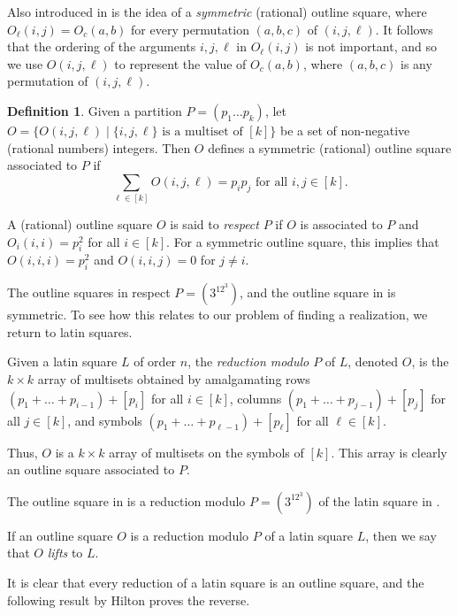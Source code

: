 \documentclass[preprint,nonatbib]{elsarticle}
\theoremstyle{definition}
\newtheorem{definition}[theorem]{Definition}
\numberwithin{equation}{section}
\begin{document}
Also introduced in \cite{kemp2024latin} is the idea of a \emph{symmetric} (rational) outline square, where $O_\ell(i,j) = O_c(a,b)$ for every permutation $(a,b,c)$ of $(i,j,\ell)$. It follows that the ordering of the arguments $i,j,\ell$ in $O_\ell(i,j)$ is not important, and so we use $O(i,j,\ell)$ to represent the value of $O_c(a,b)$, where $(a,b,c)$ is any permutation of $(i,j,\ell)$.

\begin{definition}
    Given a partition $P=(p_1\dots p_k)$, let $O = \{O(i,j,\ell)\mid \{i,j,\ell\} \text{ is a multiset of } [k]\}$ be a set of non-negative (rational numbers) integers. Then $O$ defines a symmetric (rational) outline square associated to $P$ if
    \begin{equation}
    \label{eq: symmetric outline square cond}
        \sum_{\ell\in [k]}O(i,j,\ell) = p_ip_j\text{ for all $i,j\in[k]$.}
    \end{equation}
\end{definition}

A (rational) outline square $O$ is said to \emph{respect} $P$ if $O$ is associated to $P$ and $O_i(i,i) = p_i^2$ for all $i\in[k]$. For a symmetric outline square, this implies that $O(i,i,i) = p_i^2$ and $O(i,i,j)=0$ for $j\neq i$.

The outline squares in  respect $P = (3^12^3)$, and the outline square in  is symmetric. To see how this relates to our problem of finding a realization, we return to latin squares.

    Given a latin square $L$ of order $n$, the \emph{reduction modulo $P$} of $L$, denoted $O$, is the $k\times k$ array of multisets obtained by amalgamating rows $(p_1 + \dots + p_{i-1}) + [p_i]$ for all $i\in[k]$, columns $(p_1 + \dots + p_{j-1}) + [p_j]$ for all $j\in[k]$, and symbols $(p_1 + \dots + p_{\ell-1}) + [p_\ell]$ for all $\ell\in[k]$.

    Thus, $O$ is a $k\times k$ array of multisets on the symbols of $[k]$. This array is clearly an outline square associated to $P$.

The outline square in  is a reduction modulo $P = (3^12^3)$ of the latin square in .

If an outline square $O$ is a reduction modulo $P$ of a latin square $L$, then we say that $O$ \emph{lifts} to $L$.

It is clear that every reduction of a latin square is an outline square, and the following result by Hilton proves the reverse.
\end{document}
